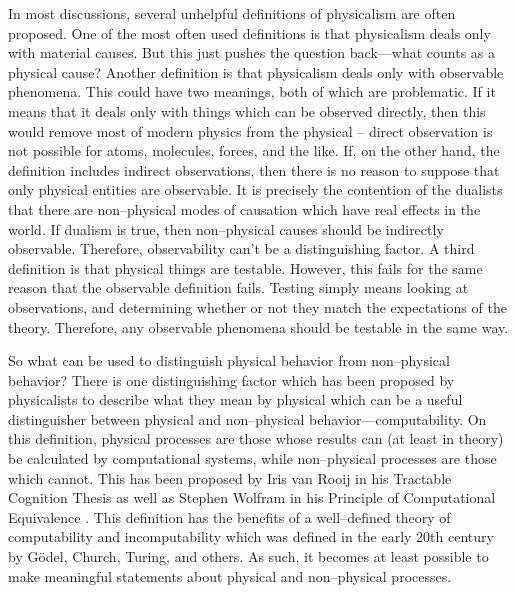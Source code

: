 In most discussions, several unhelpful definitions of physicalism are often proposed.  One of the most often used definitions is that physicalism deals only with material causes.  But this just pushes the question back---what counts as a physical cause?  Another definition is that physicalism deals only with observable phenomena.  This could have two meanings, both of which are problematic.  If it means that it deals only with things which can be observed directly, then this would remove most of modern physics from the physical -- direct observation is not possible for atoms, molecules, forces, and the like.  If, on the other hand, the definition includes indirect observations, then there is no reason to suppose that only physical entities are observable.  It is precisely the contention of the dualists that there are non--physical modes of causation which have real effects in the world.  If dualism is true, then non--physical causes should be indirectly observable.  Therefore, observability can't be a distinguishing factor.  A third definition is that physical things are testable.  However, this fails for the same reason that the observable definition fails.  Testing simply means looking at observations, and determining whether or not they match the expectations of the theory.  Therefore, any observable phenomena should be testable in the same way.

So what can be used to distinguish physical behavior from non--physical behavior?  There is one distinguishing factor which has been proposed by physicalists to describe what they mean by physical which can be a useful distinguisher between physical and non--physical behavior---computability.  On this definition, physical processes are those whose results can (at least in theory) be calculated by computational systems, while non--physical processes are those which cannot.  This has been proposed by Iris van Rooij in his Tractable Cognition Thesis as well as Stephen Wolfram in his Principle of Computational Equivalence \citep{vanrooij2008, wolfram2002}.  This definition has the benefits of a well--defined theory of computability and incomputability which was defined in the early 20th century by G\"{o}del, Church, Turing, and others.  As such, it becomes at least possible to make meaningful statements about physical and non--physical processes.

